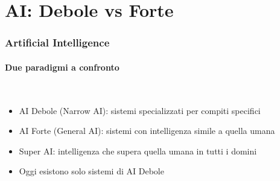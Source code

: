 \section{AI: Debole vs Forte} %
\label{sec:ai_types}
%
\begin{frame}[t,fragile] \frametitle{Artificial Intelligence}
	{\scriptsize
		\onslide<1->
            \framesubtitle{Due paradigmi a confronto}
            \vspace*{-15pt}
            \begin{minipage}[t]{\textwidth}
            \end{minipage}
            \\\vspace*{3pt}
	    	\begin{minipage}[t]{\textwidth}
				\begin{minipage}[t]{0.6\textwidth}
	    			\begin{itemize}[leftmargin=10pt,align=right]
						\onslide<2->\item[\alert{\faHandORight}] \alert{AI Debole (Narrow AI):} sistemi specializzati per compiti specifici
						\onslide<3->\item[\alert{\faHandORight}] \alert{AI Forte (General AI):} sistemi con intelligenza simile a quella umana
						\onslide<4->\item[\alert{\faHandORight}] \alert{Super AI:} intelligenza che supera quella umana in tutti i domini
						\onslide<5->\item[\alert{\faHandORight}] Oggi esistono \alert{solo} sistemi di AI Debole
					\end{itemize}
            	\end{minipage}
            	\begin{minipage}[t]{0.4\textwidth}
                	\centering
            	\end{minipage}
	    	\end{minipage}
	}
\end{frame}
